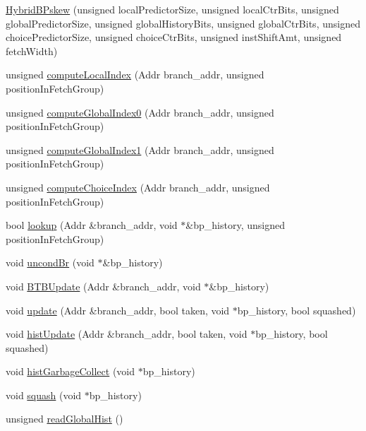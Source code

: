 \begin{DoxyCompactItemize}
\item 
\hyperlink{classHybridBPskew_a039896cdd3566d98247bf7b871766cc9}{HybridBPskew} (unsigned localPredictorSize, unsigned localCtrBits, unsigned globalPredictorSize, unsigned globalHistoryBits, unsigned globalCtrBits, unsigned choicePredictorSize, unsigned choiceCtrBits, unsigned instShiftAmt, unsigned fetchWidth)
\item 
unsigned \hyperlink{classHybridBPskew_ae8b356ac60f229ce92086836420a1d11}{computeLocalIndex} (Addr branch\_\-addr, unsigned positionInFetchGroup)
\item 
unsigned \hyperlink{classHybridBPskew_a2d3c53348902a29d3315dcec78e12a99}{computeGlobalIndex0} (Addr branch\_\-addr, unsigned positionInFetchGroup)
\item 
unsigned \hyperlink{classHybridBPskew_a4009eae987557a103d5846cd32e30333}{computeGlobalIndex1} (Addr branch\_\-addr, unsigned positionInFetchGroup)
\item 
unsigned \hyperlink{classHybridBPskew_a70b7b53463dd2cd4a6394266ea3c2ee3}{computeChoiceIndex} (Addr branch\_\-addr, unsigned positionInFetchGroup)
\item 
bool \hyperlink{classHybridBPskew_a27e2268df7da826fefe75f1a490bce11}{lookup} (Addr \&branch\_\-addr, void $\ast$\&bp\_\-history, unsigned positionInFetchGroup)
\item 
void \hyperlink{classHybridBPskew_a1dbffb30d1d0f0c4c8e6a8f1084e68e4}{uncondBr} (void $\ast$\&bp\_\-history)
\item 
void \hyperlink{classHybridBPskew_a5ceeff1b2e0cc39822346b1cd8fbab80}{BTBUpdate} (Addr \&branch\_\-addr, void $\ast$\&bp\_\-history)
\item 
void \hyperlink{classHybridBPskew_a4fb73465bf70ab821401f3d47e44fc91}{update} (Addr \&branch\_\-addr, bool taken, void $\ast$bp\_\-history, bool squashed)
\item 
void \hyperlink{classHybridBPskew_a5e73e9324e87d820712789f33100e5f4}{histUpdate} (Addr \&branch\_\-addr, bool taken, void $\ast$bp\_\-history, bool squashed)
\item 
void \hyperlink{classHybridBPskew_a4c3aa89615af200ad553461f20de8315}{histGarbageCollect} (void $\ast$bp\_\-history)
\item 
void \hyperlink{classHybridBPskew_a44db53115e8b3ccff2d9b7785c96f380}{squash} (void $\ast$bp\_\-history)
\item 
unsigned \hyperlink{classHybridBPskew_aa00b0494fe8fc804dd6ef9c1abf89c9d}{readGlobalHist} ()
\item 

\end{DoxyCompactItemize}
